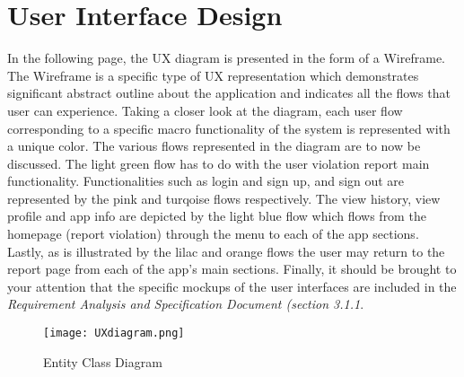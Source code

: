 \section{User Interface Design}
In the following page, the UX diagram is presented in the form of a Wireframe. The Wireframe is a specific type of UX representation which demonstrates significant abstract outline about the application and indicates all the flows that user can experience.  Taking a closer look at the diagram, each user flow corresponding to a specific macro functionality of the system is represented with a unique color. The various flows represented in the diagram are to now be discussed. The light green flow has to do with the user violation report main functionality. Functionalities such as login and sign up, and sign out are represented by the pink and turqoise flows respectively. The view history, view profile and app info are depicted by the light blue flow which flows from the homepage (report violation) through the menu to each of the app sections. Lastly, as is illustrated by the lilac and orange flows the user may return to the report page from each of the app's main sections. Finally, it should be brought to your attention that the specific mockups of the user interfaces are included in the \emph{Requirement Analysis and Specification Document (section 3.1.1}.

\begin{sidewaysfigure}
\begin{figure}[H]
\caption{Entity Class Diagram}
\label{fig:Class}
\centering
\texttt{[image: UXdiagram.png]}
\end{figure}
\end{sidewaysfigure}


